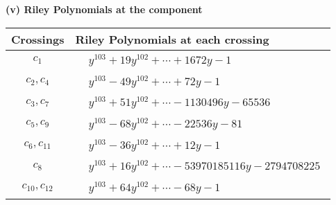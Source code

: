 \documentclass[1p]{elsarticle_modified}
\theoremstyle{definition}
\begin{document}
\newpage\renewcommand{\arraystretch}{1}
\flushleft \textbf{(v) Riley Polynomials at the component}\newline \\
\begin{tabular}{m{50pt}|m{274pt}}
Crossings & \hspace{64pt}Riley Polynomials at each crossing \\
\hline $$\begin{aligned}c_{1}\end{aligned}$$&$\begin{aligned}
&y^{103}+19 y^{102}+\cdots+1672 y-1
\end{aligned}$\\
\hline $$\begin{aligned}c_{2},c_{4}\end{aligned}$$&$\begin{aligned}
&y^{103}-49 y^{102}+\cdots+72 y-1
\end{aligned}$\\
\hline $$\begin{aligned}c_{3},c_{7}\end{aligned}$$&$\begin{aligned}
&y^{103}+51 y^{102}+\cdots-1130496 y-65536
\end{aligned}$\\
\hline $$\begin{aligned}c_{5},c_{9}\end{aligned}$$&$\begin{aligned}
&y^{103}-68 y^{102}+\cdots-22536 y-81
\end{aligned}$\\
\hline $$\begin{aligned}c_{6},c_{11}\end{aligned}$$&$\begin{aligned}
&y^{103}-36 y^{102}+\cdots+12 y-1
\end{aligned}$\\
\hline $$\begin{aligned}c_{8}\end{aligned}$$&$\begin{aligned}
&y^{103}+16 y^{102}+\cdots-53970185116 y-2794708225
\end{aligned}$\\
\hline $$\begin{aligned}c_{10},c_{12}\end{aligned}$$&$\begin{aligned}
&y^{103}+64 y^{102}+\cdots-68 y-1
\end{aligned}$\\
\hline
\end{tabular}\\~\\
\end{document}
